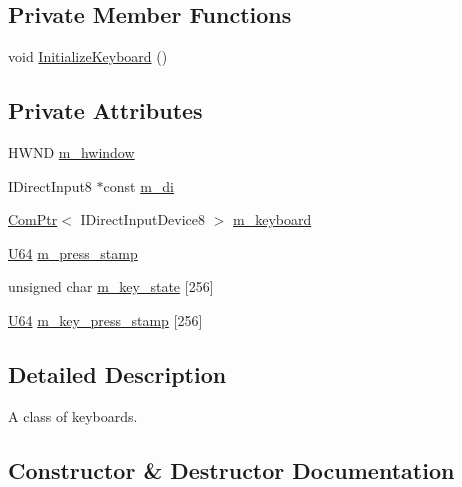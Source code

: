\subsection*{Private Member Functions}
\begin{DoxyCompactItemize}
\item 
void \hyperlink{classmage_1_1_keyboard_af7aea666e38e5d91ad6bfee2124819a3}{Initialize\+Keyboard} ()
\end{DoxyCompactItemize}
\subsection*{Private Attributes}
\begin{DoxyCompactItemize}
\item 
H\+W\+ND \hyperlink{classmage_1_1_keyboard_aa7196c689dad6f5aaf35e3929de02791}{m\+\_\+hwindow}
\item 
I\+Direct\+Input8 $\ast$const \hyperlink{classmage_1_1_keyboard_a627eeef05bae81a60c2c44fd039ff7f8}{m\+\_\+di}
\item 
\hyperlink{namespacemage_ae74f374780900893caa5555d1031fd79}{Com\+Ptr}$<$ I\+Direct\+Input\+Device8 $>$ \hyperlink{classmage_1_1_keyboard_a992b8b8caf0d858163e5e9af04302324}{m\+\_\+keyboard}
\item 
\hyperlink{namespacemage_a6672cf3c861707ce4a3235a3eb43941d}{U64} \hyperlink{classmage_1_1_keyboard_a075349dbce5145f46146ccdfea78214a}{m\+\_\+press\+\_\+stamp}
\item 
unsigned char \hyperlink{classmage_1_1_keyboard_a7499df459499f5addd50507ea1e2358c}{m\+\_\+key\+\_\+state} \mbox{[}256\mbox{]}
\item 
\hyperlink{namespacemage_a6672cf3c861707ce4a3235a3eb43941d}{U64} \hyperlink{classmage_1_1_keyboard_a4a9e80f99dfea8ac518fb451965d4047}{m\+\_\+key\+\_\+press\+\_\+stamp} \mbox{[}256\mbox{]}
\end{DoxyCompactItemize}


\subsection{Detailed Description}
A class of keyboards. 

\subsection{Constructor \& Destructor Documentation}
\hypertarget{classmage_1_1_keyboard_ac89c8f4132508901ff2ca57c68709928}{}\label{classmage_1_1_keyboard_ac89c8f4132508901ff2ca57c68709928} 
